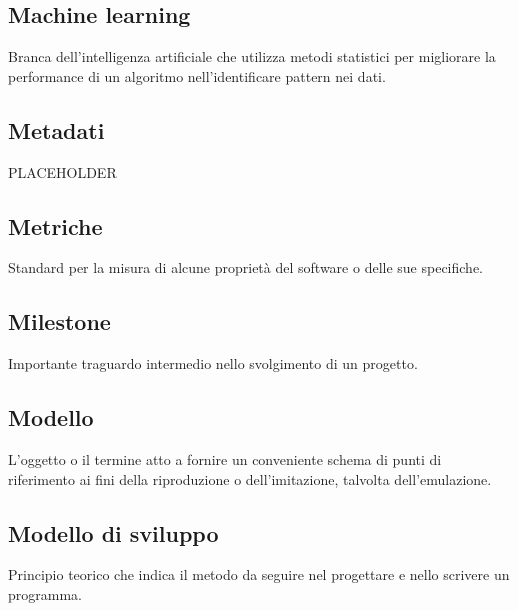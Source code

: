 \documentclass[../glossario.tex]{subfiles}
\begin{document}
\subsection*{Machine learning} 
Branca dell'intelligenza artificiale che utilizza metodi statistici per migliorare la performance di un algoritmo nell'identificare pattern nei dati.


\subsection*{Metadati}
PLACEHOLDER


\subsection*{Metriche} 
Standard per la misura di alcune proprietà del software o delle sue specifiche.

\subsection*{Milestone} 
Importante traguardo intermedio nello svolgimento di un progetto.

\subsection*{Modello} 
L'oggetto o il termine atto a fornire un conveniente schema di punti di riferimento ai fini della riproduzione o dell'imitazione, talvolta dell'emulazione.

\subsection*{Modello di sviluppo} 
Principio teorico che indica il metodo da seguire nel progettare e nello scrivere un programma.

    
\end{document}
